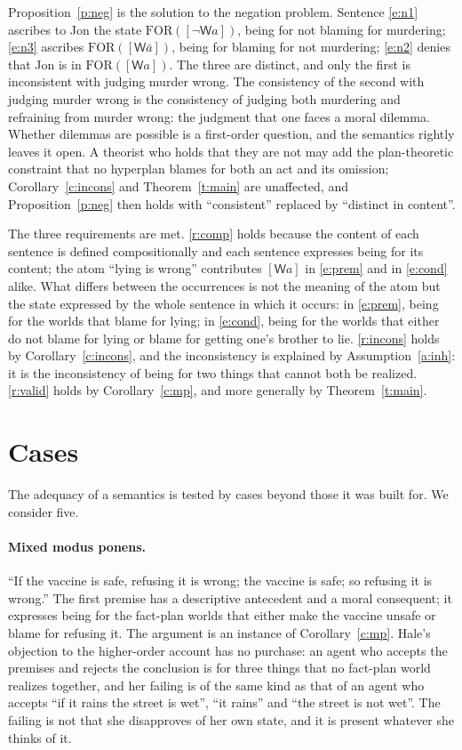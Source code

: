 \documentclass{situationist-preprint}
\begin{document}
Proposition~\ref{p:neg} is the solution to the negation problem. Sentence \ref{e:n1} ascribes to Jon the state $\mathrm{FOR}([\neg\mathsf{W}a])$, being for not blaming for murdering; \ref{e:n3} ascribes $\mathrm{FOR}([\mathsf{W}\bar a])$, being for blaming for not murdering; \ref{e:n2} denies that Jon is in $\mathrm{FOR}([\mathsf{W}a])$. The three are distinct, and only the first is inconsistent with judging murder wrong. The consistency of the second with judging murder wrong is the consistency of judging both murdering and refraining from murder wrong: the judgment that one faces a moral dilemma. Whether dilemmas are possible is a first-order question, and the semantics rightly leaves it open. A theorist who holds that they are not may add the plan-theoretic constraint that no hyperplan blames for both an act and its omission; Corollary~\ref{c:incons} and Theorem~\ref{t:main} are unaffected, and Proposition~\ref{p:neg} then holds with \enquote{consistent} replaced by \enquote{distinct in content}.

The three requirements are met. \ref{r:comp} holds because the content of each sentence is defined compositionally and each sentence expresses being for its content; the atom \enquote{lying is wrong} contributes $[\mathsf{W}a]$ in \ref{e:prem} and in \ref{e:cond} alike. What differs between the occurrences is not the meaning of the atom but the state expressed by the whole sentence in which it occurs: in \ref{e:prem}, being for the worlds that blame for lying; in \ref{e:cond}, being for the worlds that either do not blame for lying or blame for getting one's brother to lie. \ref{r:incons} holds by Corollary~\ref{c:incons}, and the inconsistency is explained by Assumption~\ref{a:inh}: it is the inconsistency of being for two things that cannot both be realized. \ref{r:valid} holds by Corollary~\ref{c:mp}, and more generally by Theorem~\ref{t:main}.

\section{Cases}\label{s:cases}

The adequacy of a semantics is tested by cases beyond those it was built for. We consider five.

\paragraph{Mixed modus ponens.} \enquote{If the vaccine is safe, refusing it is wrong; the vaccine is safe; so refusing it is wrong.} The first premise has a descriptive antecedent and a moral consequent; it expresses being for the fact-plan worlds that either make the vaccine unsafe or blame for refusing it. The argument is an instance of Corollary~\ref{c:mp}. Hale's objection to the higher-order account has no purchase: an agent who accepts the premises and rejects the conclusion is for three things that no fact-plan world realizes together, and her failing is of the same kind as that of an agent who accepts \enquote{if it rains the street is wet}, \enquote{it rains} and \enquote{the street is not wet}. The failing is not that she disapproves of her own state, and it is present whatever she thinks of it.
\end{document}
